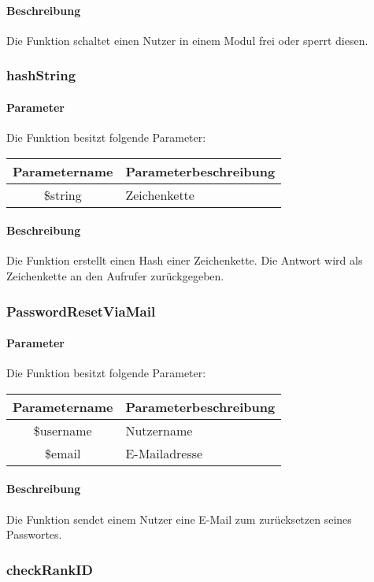 \paragraph{Beschreibung} Die Funktion schaltet einen Nutzer in einem Modul frei oder sperrt diesen.
\subsubsection{hashString}
\paragraph{Parameter} Die Funktion besitzt folgende Parameter:
\begin{table}[H]
	\begin{tabular}{|c|p{11cm}|}
		\hline
		\textbf{Parametername} & \textbf{Parameterbeschreibung} \\ \hline
		\$string & Zeichenkette \\ \hline
	\end{tabular}
\end{table}
\paragraph{Beschreibung} Die Funktion erstellt einen Hash einer Zeichenkette. Die Antwort wird als Zeichenkette an den Aufrufer zurückgegeben.
\subsubsection{PasswordResetViaMail}
\paragraph{Parameter} Die Funktion besitzt folgende Parameter:
\begin{table}[H]
	\begin{tabular}{|c|p{11cm}|}
		\hline
		\textbf{Parametername} & \textbf{Parameterbeschreibung} \\ \hline
		\$username & Nutzername \\ \hline
		\$email    & E-Mailadresse \\ \hline
	\end{tabular}
\end{table}
\paragraph{Beschreibung} Die Funktion sendet einem Nutzer eine E-Mail zum zurücksetzen seines Passwortes.
\subsubsection{checkRankID}
